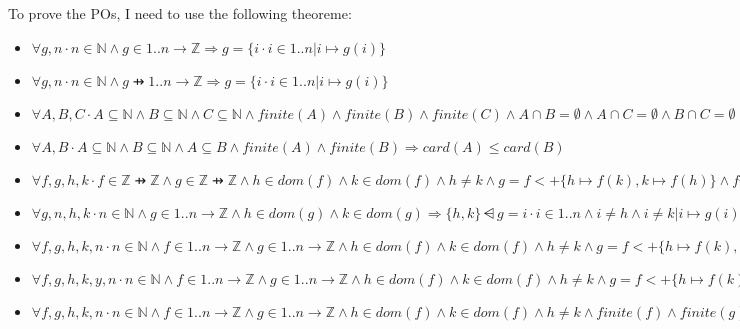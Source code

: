 To prove the POs, I need to use the following theoreme: 
\begin{itemize}
\item $\forall g,n \cdot n \in \mathbb{N} \land g \in 1..n \to \mathbb{Z} \Rightarrow g=\{i \cdot i \in 1..n | i \mapsto g(i)\}$
\item $\forall g,n \cdot n \in \mathbb{N} \land g \pfun 1..n \to \mathbb{Z} \Rightarrow g= \{i \cdot i \in 1..n | i \mapsto g(i)\}$
\item $\forall A,B,C \cdot A \subseteq \mathbb{N} \land B \subseteq \mathbb{N} \land C \subseteq \mathbb{N} \land finite(A) \land finite(B) \land finite(C) \land A \cap B = \emptyset \land A \cap C = \emptyset \land B \cap C = \emptyset \Rightarrow card(A \cup B \cup C) = card(A) + card(B) + card(C)$

\item $\forall A,B \cdot A \subseteq \mathbb{N} \land B \subseteq \mathbb{N} \land A \subseteq B \land finite(A) \land finite(B)  \Rightarrow card(A) \leq card(B)$

\item $\forall f,g,h,k \cdot f \in \mathbb{Z} \pfun \mathbb{Z} \land g \in \mathbb{Z} \pfun \mathbb{Z} \land h \in dom(f) \land k \in dom(f) \land h \neq k \land g = f <+ \{h \mapsto f(k), k \mapsto f(h)\} \land finite(f) \land finite(g) \Rightarrow dom(g) = dom(f)$

\item $\forall g,n,h,k \cdot n \in \mathbb{N} \land g \in 1..n \to \mathbb{Z} \land h \in dom(g) \land k \in dom(g) \Rightarrow \{h,k\} \dsub g = {i \cdot i \in 1..n \land i \neq h \land i \neq k | i \mapsto g(i)}$

\item $\forall f,g,h,k,n \cdot n \in \mathbb{N} \land f \in 1..n \to \mathbb{Z} \land g \in 1..n \to \mathbb{Z} \land h \in dom(f) \land k \in dom(f) \land h \neq k \land g = f <+ \{h \mapsto f(k), k \mapsto f(h)\} \land finite(f) \land finite(g) \Rightarrow ran(g) = ran(f)$

\item $\forall f,g,h,k,y,n \cdot n\in \mathbb{N} \land f \in 1..n \to \mathbb{Z} \land g \in 1..n \to \mathbb{Z} \land h \in dom(f) \land k \in dom(f) \land h \neq k \land g = f<+\{h \mapsto f(k), k \mapsto f(h) \} \land finite(f) \land finite(g) \land y \in ran(f) \Rightarrow card(\{u \cdot u \in dom(f) \land u \mapsto y \in f | u \}) =  card(\{x \cdot x \in dom(g) \land x \mapsto y \in g | x \})$

\item $\forall f,g,h,k,n \cdot n \in \mathbb{N} \land f \in 1..n \to \mathbb{Z} \land g \in 1..n \to \mathbb{Z} \land h \in dom(f) \land k \in dom(f) \land h \neq k \land finite(f) \land finite(g) \land (\forall i \cdot i \in 1..n \land i \neq h \land i \neq k \Rightarrow g(i)=f(i)) \land g(h)=f(k) \land g(k)=f(h) \Rightarrow g = f<+\{h \mapsto f(k), k \mapsto f(h)\}$
\end{itemize}

